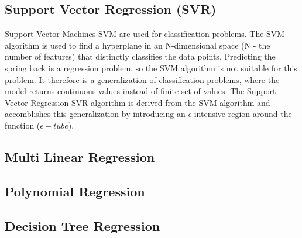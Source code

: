 \subsection{Support Vector Regression (SVR)}
Support Vector Machines \ac{SVM} are used for classification problems. The \ac{SVM} algorithm is used to find a hyperplane in an N-dimensional space (N - the number of features) that distinctly classifies the data points. \cite[p. 42]{awad_efficientlearningmachines_2015}
Predicting the spring back is a regression problem, so the \ac{SVM} algorithm is not suitable for this problem. It therefore is a generalization of classification problems, where the model returns continuous values instead of finite set of values.
The Support Vector Regression \ac{SVR} algorithm is derived from the \ac{SVM} algorithm and accomblishes this generalization by introducing an $\epsilon$-intensive region around the function ($\epsilon-tube$).  \cite[p. 67]{awad_efficientlearningmachines_2015}

\subsection{Multi Linear Regression}
\subsection{Polynomial Regression}
\subsection{Decision Tree Regression}
